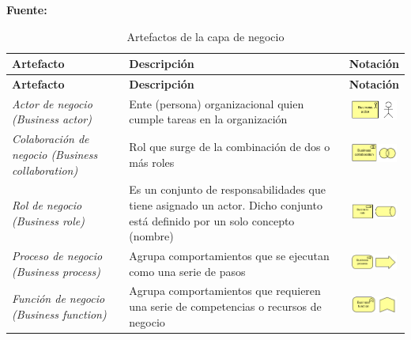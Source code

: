  \begin{center}
 
 	\textbf{Fuente:} \cite{archimate2}
 	
	\begin{longtable}{|p{4cm}|p{6cm}|c|}
	\caption{Artefactos de la capa de negocio \label{tab:artefactos_capa_negocio}} \\
	\hline
    \textbf{Artefacto} & 
    \textbf{Descripción} & 
    \textbf{Notación} \\ 
    \hline
	\endfirsthead
    \hline
    \textbf{Artefacto} & 
    \textbf{Descripción} & 
    \textbf{Notación} \\ 
    \hline
	\endhead
    \hline
	\endfoot
	\hline
	\endlastfoot
    \hline
    \textit{Actor de negocio (Business actor)} & 
    Ente (persona) organizacional quien cumple tareas en la organización &  
    \includegraphics[width=1.5cm]{./imagenes/Archimate/businessactor.png}\\
	\hline
	\textit{Colaboración de negocio (Business collaboration)} & 
    Rol que surge de la combinación de dos o más roles &  
    \includegraphics[width=1.5cm]{./imagenes/Archimate/businesscollaboration.png}\\
	\hline    
    \textit{Rol de negocio (Business role)} & 
    Es un conjunto de responsabilidades que tiene asignado un actor. Dicho conjunto está definido por un solo concepto (nombre) &  
    \includegraphics[width=1.5cm]{./imagenes/Archimate/businessrole.png}\\
    \hline
    \textit{Proceso de negocio (Business process)} & 
    Agrupa comportamientos que se ejecutan como una serie de pasos &  
    \includegraphics[width=1.5cm]{./imagenes/Archimate/businessprocess.png}\\
	\hline
	\textit{Función de negocio (Business function)} & 
    Agrupa comportamientos que requieren una serie de competencias o recursos de negocio &  
    \includegraphics[width=1.5cm]{./imagenes/Archimate/businessfunction.png}\\

\end{longtable}
\end{center}
